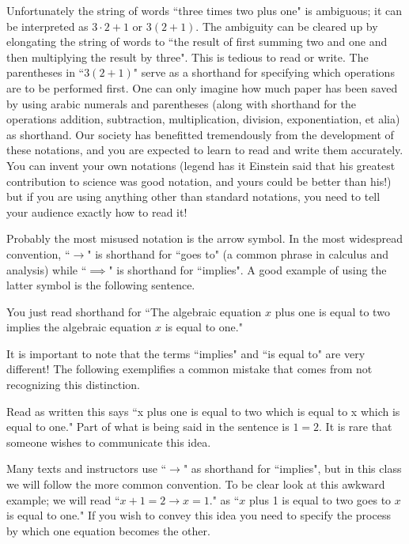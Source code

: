 \documentclass[12pt]{article}
\def\noi{\noindent}
\def\thup{\rightthumbsup}
\def\thdn{\rightthumbsdown}
\begin{document}


Unfortunately the string of words ``three times two plus one" is ambiguous; it can be interpreted as $3\cdot2+1$ or $3(2+1)$. The ambiguity can be cleared up by elongating the string of words to ``the result of first summing two and one and then multiplying the result by three". 
This is tedious to read or write. The parentheses in ``$3(2+1)$" serve as a shorthand for specifying which operations are to be performed first. One can only imagine how much paper has been saved by using arabic numerals and parentheses (along with shorthand for the operations addition, subtraction, multiplication, division, exponentiation, et alia) as shorthand. Our society has benefitted tremendously from the development of these notations, and you are expected to learn to read and write them accurately. You can invent your own notations (legend has it Einstein said that his greatest contribution to science was good notation, and yours could be better than his!) but if you are using anything other than standard notations, you need to tell your audience exactly how to read it! 

Probably the most misused notation is the arrow symbol. 
In the most widespread convention,  ``$\to$" is shorthand for ``goes to" (a common phrase in calculus and analysis) while ``$\implies$" is shorthand for ``implies". A good example of using the latter symbol is the following sentence. 
\begin{quote}
 \thup
\end{quote}
You just read shorthand for ``The algebraic equation $x$ plus one is equal to two implies the algebraic equation $x$ is equal to one." 

It is important to note that the terms ``implies" and ``is equal to" are very different! The following exemplifies a common mistake that comes from not recognizing this distinction.
\begin{quote}
 { \thdn}
\end{quote}
Read as written this says ``x plus one is equal to two which is equal to x which is equal to one." Part of what is being said in the sentence is $1=2$. It is rare that someone wishes to communicate this idea.

Many texts and instructors use ``$\to$" as shorthand for ``implies", but in this class we will follow the more common convention. To be clear look at this awkward example; we will read 
``$x+1=2 \to x=1.$" as ``$x$ plus 1 is equal to two goes to $x$ is equal to one." If you wish to convey this idea you need to specify the process by which one equation becomes the other. 
\end{document}
